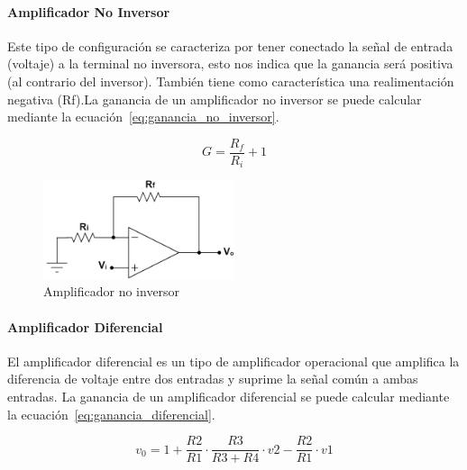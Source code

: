                 \paragraph{Amplificador No Inversor}
                Este tipo de configuración se caracteriza por tener conectado la señal de entrada (voltaje) a la terminal no inversora, esto nos indica que la ganancia será positiva (al contrario del inversor). También tiene como característica una realimentación negativa (Rf).La ganancia de un amplificador no inversor se puede calcular mediante la ecuación~\ref{eq:ganancia_no_inversor}.

                \begin{equation}
                    \label{eq:ganancia_no_inversor}
                    G = \frac{R_f}{R_i} + 1
                \end{equation}

                \begin{figure}[H]
                    \centering
                    \includegraphics[width=0.5\textwidth]{img/Desarrollo/Amplificador_No_Inversor.png}
                    \caption[Amplificador no inversor]{Amplificador no inversor\footnotemark}
                    \label{fig:Amplificador_No_Inversor}
                \end{figure}

                \paragraph{Amplificador Diferencial}
                El amplificador diferencial es un tipo de amplificador operacional que amplifica la diferencia de voltaje entre dos entradas y suprime la señal común a ambas entradas. La ganancia de un amplificador diferencial se puede calcular mediante la ecuación~\ref{eq:ganancia_diferencial}.

                \begin{equation}
                    \label{eq:voltaje_diferencial}
                    v_0 = 1 + \frac{R2}{R1} \cdot \frac{R3}{R3 + R4} \cdot v2 - \frac{R2}{R1} \cdot v1
                \end{equation}

